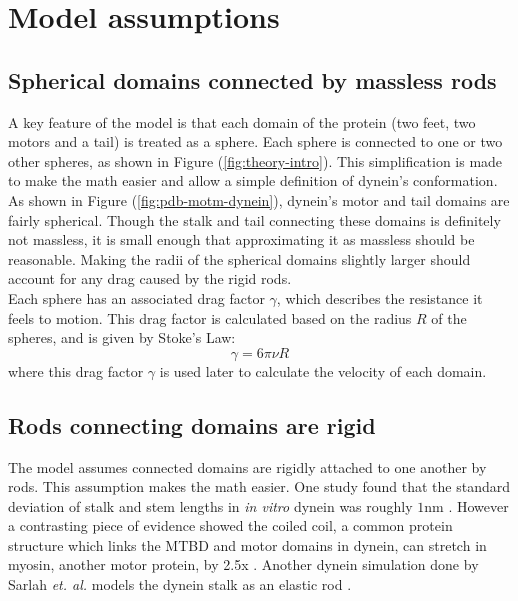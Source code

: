 \documentclass[
11pt, %
english, %
singlespacing, %
headsepline, %
chapterinoneline, %
]{MastersDoctoralThesis} %
\begin{document}

\section{Model assumptions}
\subsection{Spherical domains connected by massless rods}
A key feature of the model is that each domain of the protein (two feet, two motors and a tail) is treated as a sphere. Each sphere is connected to one or two other spheres, as shown in Figure (\ref{fig:theory-intro}). This simplification is made to make the math easier and allow a simple definition of dynein's conformation.\\

As shown in Figure (\ref{fig:pdb-motm-dynein}), dynein's motor and tail domains are fairly spherical. Though the stalk and tail connecting these domains is definitely not massless, it is small enough that approximating it as massless should be reasonable. Making the radii of the spherical domains slightly larger should account for any drag caused by the rigid rods.\\

Each sphere has an associated drag factor $\gamma$, which describes the resistance it feels to motion. This drag factor is calculated based on the radius $R$ of the spheres, and is given by Stoke's Law:
%
\begin{equation}
  \gamma = 6\pi\nu R
\end{equation}
%
where this drag factor $\gamma$ is used later to calculate the velocity of each domain.\\

\subsection{Rods connecting domains are rigid}
The model assumes connected domains are rigidly attached to one another by rods. This assumption makes the math easier. One study found that the standard deviation of stalk and stem lengths in \textit{in vitro} dynein was roughly $1\text{nm}$ \cite{burgess-paper}. However a contrasting piece of evidence showed the coiled coil, a common protein structure which links the MTBD and motor domains in dynein, can stretch in myosin, another motor protein, by 2.5x \cite{myosin-cc-elasticity}. Another dynein simulation done by Sarlah \textit{et. al.} models the dynein stalk as an elastic rod \cite{sarlahmodel}.\\
\end{document}
